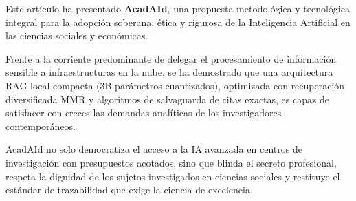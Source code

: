 \documentclass[12pt,a4paper]{article}
\begin{document}
Este artículo ha presentado \textbf{AcadAId}, una propuesta metodológica y tecnológica integral para la adopción soberana, ética y rigurosa de la Inteligencia Artificial en las ciencias sociales y económicas. 

Frente a la corriente predominante de delegar el procesamiento de información sensible a infraestructuras en la nube, se ha demostrado que una arquitectura RAG local compacta (3B parámetros cuantizados), optimizada con recuperación diversificada MMR y algoritmos de salvaguarda de citas exactas, es capaz de satisfacer con creces las demandas analíticas de los investigadores contemporáneos. 

AcadAId no solo democratiza el acceso a la IA avanzada en centros de investigación con presupuestos acotados, sino que blinda el secreto profesional, respeta la dignidad de los sujetos investigados en ciencias sociales y restituye el estándar de trazabilidad que exige la ciencia de excelencia.

\newpage


\end{document}
